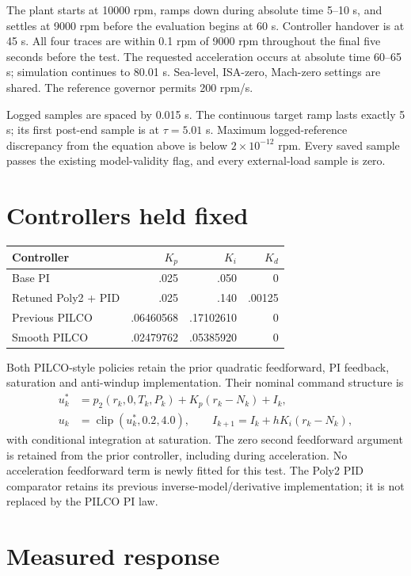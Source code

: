 \documentclass[11pt,a4paper]{article}
\begin{document}
The plant starts at 10000 rpm, ramps down during absolute time 5--10 s, and settles at 9000 rpm before the evaluation begins at 60 s. Controller handover is at 45 s. All four traces are within 0.1 rpm of 9000 rpm throughout the final five seconds before the test. The requested acceleration occurs at absolute time 60--65 s; simulation continues to 80.01 s. Sea-level, ISA-zero, Mach-zero settings are shared. The reference governor permits 200 rpm/s.

Logged samples are spaced by 0.015 s. The continuous target ramp lasts exactly 5 s; its first post-end sample is at $\tau=5.01$ s. Maximum logged-reference discrepancy from the equation above is below $2\times10^{-12}$ rpm. Every saved sample passes the existing model-validity flag, and every external-load sample is zero.

\section{Controllers held fixed}
\begin{center}\small\begin{tabular}{lrrr}\toprule Controller & $K_p$ & $K_i$ & $K_d$\\\midrule
Base PI & .025 & .050 & 0\\
Retuned Poly2 + PID & .025 & .140 & .00125\\
Previous PILCO & .06460568 & .17102610 & 0\\
Smooth PILCO & .02479762 & .05385920 & 0\\\bottomrule\end{tabular}\end{center}
Both PILCO-style policies retain the prior quadratic feedforward, PI feedback, saturation and anti-windup implementation. Their nominal command structure is
\begin{align}u_k^*&=p_2(r_k,0,T_k,P_k)+K_p(r_k-N_k)+I_k,\\
u_k&=\operatorname{clip}(u_k^*,0.2,4.0),\qquad
I_{k+1}=I_k+hK_i(r_k-N_k),\end{align}
with conditional integration at saturation. The zero second feedforward argument is retained from the prior controller, including during acceleration. No acceleration feedforward term is newly fitted for this test. The Poly2 PID comparator retains its previous inverse-model/derivative implementation; it is not replaced by the PILCO PI law.
\clearpage\section{Measured response}
\end{document}

